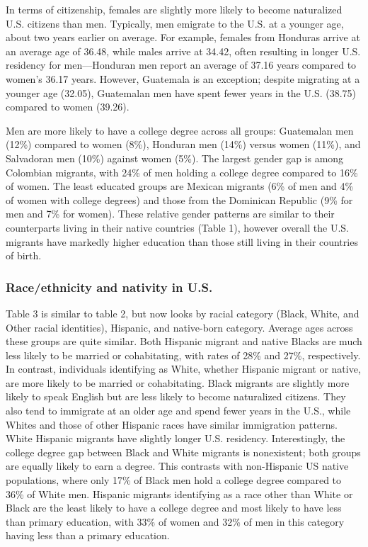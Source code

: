 \documentclass[
]{article}
\begin{document}
In terms of citizenship, females are slightly more likely to become
naturalized U.S. citizens than men. Typically, men emigrate to the U.S.
at a younger age, about two years earlier on average. For example,
females from Honduras arrive at an average age of 36.48, while males
arrive at 34.42, often resulting in longer U.S. residency for
men---Honduran men report an average of 37.16 years compared to women's
36.17 years. However, Guatemala is an exception; despite migrating at a
younger age (32.05), Guatemalan men have spent fewer years in the U.S.
(38.75) compared to women (39.26).

Men are more likely to have a college degree across all groups:
Guatemalan men (12\%) compared to women (8\%), Honduran men (14\%)
versus women (11\%), and Salvadoran men (10\%) against women (5\%). The
largest gender gap is among Colombian migrants, with 24\% of men holding
a college degree compared to 16\% of women. The least educated groups
are Mexican migrants (6\% of men and 4\% of women with college degrees)
and those from the Dominican Republic (9\% for men and 7\% for women).
These relative gender patterns are similar to their counterparts living
in their native countries (Table 1), however overall the U.S. migrants
have markedly higher education than those still living in their
countries of birth.

\subsubsection{Race/ethnicity and nativity in
U.S.}\label{raceethnicity-and-nativity-in-u.s.}

Table 3 is similar to table 2, but now looks by racial category (Black,
White, and Other racial identities), Hispanic, and native-born category.
Average ages across these groups are quite similar. Both Hispanic
migrant and native Blacks are much less likely to be married or
cohabitating, with rates of 28\% and 27\%, respectively. In contrast,
individuals identifying as White, whether Hispanic migrant or native,
are more likely to be married or cohabitating. Black migrants are
slightly more likely to speak English but are less likely to become
naturalized citizens. They also tend to immigrate at an older age and
spend fewer years in the U.S., while Whites and those of other Hispanic
races have similar immigration patterns. White Hispanic migrants have
slightly longer U.S. residency. Interestingly, the college degree gap
between Black and White migrants is nonexistent; both groups are equally
likely to earn a degree. This contrasts with non-Hispanic US native
populations, where only 17\% of Black men hold a college degree compared
to 36\% of White men. Hispanic migrants identifying as a race other than
White or Black are the least likely to have a college degree and most
likely to have less than primary education, with 33\% of women and 32\%
of men in this category having less than a primary education.
\end{document}
